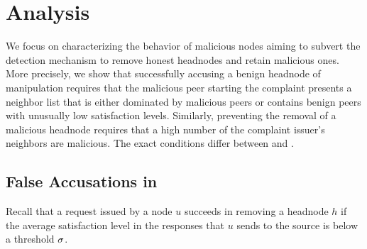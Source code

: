 \section{Analysis}
\label{sec:analysis}



We focus on characterizing the behavior of malicious nodes aiming to subvert the detection mechanism to remove honest headnodes and retain malicious ones. 
More precisely, we show that successfully accusing a benign headnode of manipulation requires that the malicious peer starting the complaint presents a neighbor list that is either dominated by malicious peers or contains benign peers with unusually low satisfaction levels. Similarly, preventing the removal of a malicious headnode requires that a high number of the complaint issuer's neighbors are malicious. 
The exact conditions differ between \drop and \block.



\subsection{False Accusations in \drop} 
  
Recall that a \drop request issued by a node $u$ succeeds in removing a headnode $h$ if the average satisfaction level in the responses that $u$ sends to the source is below a threshold $\sigma$.  


